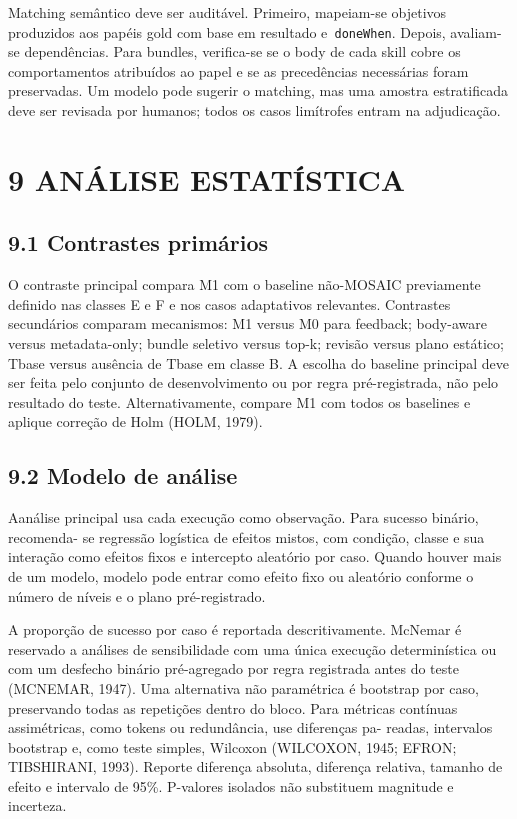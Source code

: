 \documentclass[12pt,a4paper]{article}
\begin{document}
Matching semântico deve ser auditável. Primeiro, mapeiam-se objetivos produzidos aos papéis gold com base em resultado e\texttt{ doneWhen}. Depois, avaliam-se dependências. Para bundles, verifica-se se o body de cada skill cobre os comportamentos atribuídos ao papel e se as precedências necessárias foram preservadas. Um modelo pode sugerir o matching, mas uma amostra estratificada deve ser revisada por humanos; todos os casos limítrofes entram na adjudicação.


\section*{9 ANÁLISE ESTATÍSTICA}

\subsection*{9.1 Contrastes primários}

O contraste principal compara M1 com o baseline não-MOSAIC previamente definido nas classes E e F e nos casos adaptativos relevantes. Contrastes secundários comparam mecanismos: M1 versus M0 para feedback; body-aware versus metadata-only; bundle seletivo versus top-k; revisão versus plano estático; Tbase versus ausência de Tbase em classe B. A escolha do baseline principal deve ser feita pelo conjunto de desenvolvimento ou por regra pré-registrada, não pelo resultado do teste. Alternativamente, compare M1 com todos os baselines e aplique correção de Holm (HOLM, 1979).


\subsection*{9.2 Modelo de análise}

Aanálise principal usa cada execução como observação. Para sucesso binário, recomenda- se regressão logística de efeitos mistos, com condição, classe e sua interação como efeitos fixos e intercepto aleatório por caso. Quando houver mais de um modelo, modelo pode entrar como efeito fixo ou aleatório conforme o número de níveis e o plano pré-registrado.



A proporção de sucesso por caso é reportada descritivamente. McNemar é reservado a análises de sensibilidade com uma única execução determinística ou com um desfecho binário pré-agregado por regra registrada antes do teste (MCNEMAR, 1947). Uma alternativa não paramétrica é bootstrap por caso, preservando todas as repetições dentro do bloco. Para métricas contínuas assimétricas, como tokens ou redundância, use diferenças pa- readas, intervalos bootstrap e, como teste simples, Wilcoxon (WILCOXON, 1945; EFRON; TIBSHIRANI, 1993). Reporte diferença absoluta, diferença relativa, tamanho de efeito e intervalo de 95\%. P-valores isolados não substituem magnitude e incerteza.
\end{document}
